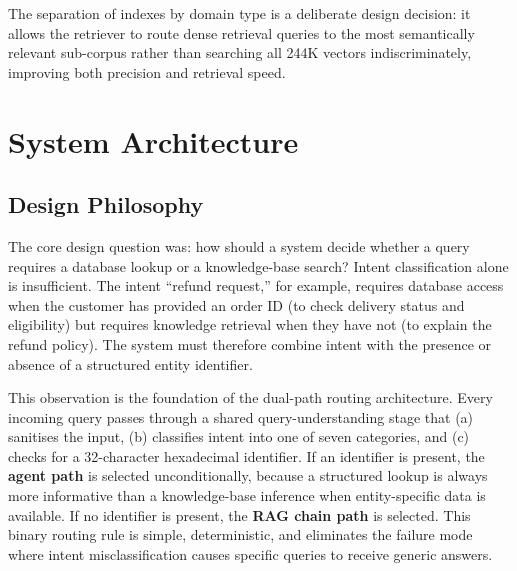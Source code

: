 \documentclass[conference]{IEEEtran}
\begin{document}
The separation of indexes by domain type is a deliberate design decision: it
allows the retriever to route dense retrieval queries to the most semantically
relevant sub-corpus rather than searching all 244K vectors indiscriminately,
improving both precision and retrieval speed.

\section{System Architecture}

\subsection{Design Philosophy}
The core design question was: how should a system decide whether a query requires
a database lookup or a knowledge-base search? Intent classification alone is
insufficient. The intent ``refund request,'' for example, requires database access
when the customer has provided an order ID (to check delivery status and eligibility)
but requires knowledge retrieval when they have not (to explain the refund policy).
The system must therefore combine intent with the presence or absence of a
structured entity identifier.

This observation is the foundation of the dual-path routing architecture. Every
incoming query passes through a shared query-understanding stage that (a) sanitises
the input, (b) classifies intent into one of seven categories, and (c) checks for a
32-character hexadecimal identifier. If an identifier is present, the \textbf{agent
path} is selected unconditionally, because a structured lookup is always more
informative than a knowledge-base inference when entity-specific data is available.
If no identifier is present, the \textbf{RAG chain path} is selected. This binary
routing rule is simple, deterministic, and eliminates the failure mode where
intent misclassification causes specific queries to receive generic answers.
\end{document}
